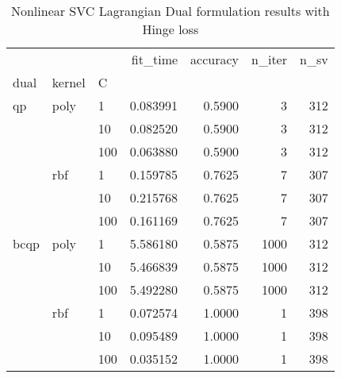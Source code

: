 \begin{table}[H]
\centering
\caption{Nonlinear SVC Lagrangian Dual formulation results with Hinge loss}
\label{nonlinear_lagrangian_dual_svc_cv_results}
\begin{tabular}{lllrrrr}
\toprule
     &     &     &  fit\_time &  accuracy &  n\_iter &  n\_sv \\
dual & kernel & C &           &           &         &       \\
\midrule
qp & poly & 1   &  0.083991 &    0.5900 &       3 &   312 \\
     &     & 10  &  0.082520 &    0.5900 &       3 &   312 \\
     &     & 100 &  0.063880 &    0.5900 &       3 &   312 \\
     & rbf & 1   &  0.159785 &    0.7625 &       7 &   307 \\
     &     & 10  &  0.215768 &    0.7625 &       7 &   307 \\
     &     & 100 &  0.161169 &    0.7625 &       7 &   307 \\
bcqp & poly & 1   &  5.586180 &    0.5875 &    1000 &   312 \\
     &     & 10  &  5.466839 &    0.5875 &    1000 &   312 \\
     &     & 100 &  5.492280 &    0.5875 &    1000 &   312 \\
     & rbf & 1   &  0.072574 &    1.0000 &       1 &   398 \\
     &     & 10  &  0.095489 &    1.0000 &       1 &   398 \\
     &     & 100 &  0.035152 &    1.0000 &       1 &   398 \\
\bottomrule
\end{tabular}
\end{table}

